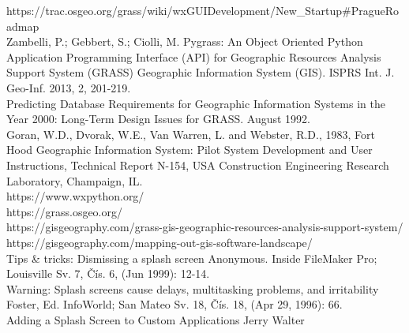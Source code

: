 \documentclass[a4paper,10pt,twoside]{article}
\begin{document}
\newpage
\vspace*{-6ex}
\renewcommand{\refname}{References} 
	
	

\noindent
\large

https://trac.osgeo.org/grass/wiki/wxGUIDevelopment/New\_Startup\#PragueRoadmap \\

Zambelli, P.; Gebbert, S.; Ciolli, M. Pygrass: An Object Oriented Python Application Programming Interface (API) for Geographic Resources Analysis Support System (GRASS) Geographic Information System (GIS). ISPRS Int. J. Geo-Inf. 2013, 2, 201-219. \\

Predicting Database Requirements for Geographic Information Systems in the Year 2000: Long-Term Design Issues for GRASS. August 1992.\\

Goran, W.D., Dvorak, W.E., Van Warren, L. and Webster, R.D., 1983, Fort Hood Geographic Information System: Pilot System Development and User Instructions, Technical Report N-154, USA Construction Engineering Research Laboratory, Champaign, IL.\\

https://www.wxpython.org/\\

https://grass.osgeo.org/\\

https://gisgeography.com/grass-gis-geographic-resources-analysis-support-system/\\

https://gisgeography.com/mapping-out-gis-software-landscape/\\

Tips \& tricks: Dismissing a splash screen Anonymous. Inside FileMaker Pro; Louisville Sv. 7, Čís. 6,  (Jun 1999): 12-14. \\

Warning: Splash screens cause delays, multitasking problems, and irritability Foster, Ed. InfoWorld; San Mateo Sv. 18, Čís. 18,  (Apr 29, 1996): 66. \\

Adding a Splash Screen to Custom Applications Jerry Walter \\
\end{document}
